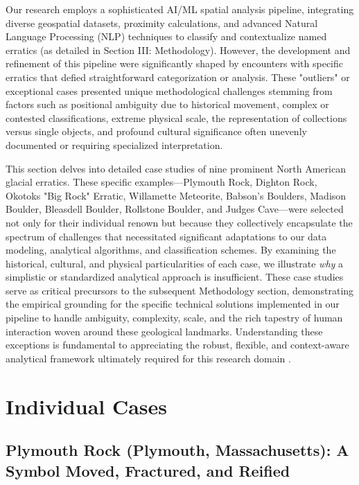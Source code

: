 \documentclass[
11pt, %
english, %
singlespacing, %
headsepline, %
]{MastersDoctoralThesis} %
\begin{document}
Our research employs a sophisticated AI/ML spatial analysis pipeline, integrating diverse geospatial datasets, proximity calculations, and advanced Natural Language Processing (NLP) techniques to classify and contextualize named erratics (as detailed in Section III: Methodology). However, the development and refinement of this pipeline were significantly shaped by encounters with specific erratics that defied straightforward categorization or analysis. These "outliers" or exceptional cases presented unique methodological challenges stemming from factors such as positional ambiguity due to historical movement, complex or contested classifications, extreme physical scale, the representation of collections versus single objects, and profound cultural significance often unevenly documented or requiring specialized interpretation.

This section delves into detailed case studies of nine prominent North American glacial erratics. These specific examples—Plymouth Rock, Dighton Rock, Okotoks "Big Rock" Erratic, Willamette Meteorite, Babson's Boulders, Madison Boulder, Bleasdell Boulder, Rollstone Boulder, and Judges Cave—were selected not only for their individual renown but because they collectively encapsulate the spectrum of challenges that necessitated significant adaptations to our data modeling, analytical algorithms, and classification schemes. By examining the historical, cultural, and physical particularities of each case, we illustrate \emph{why} a simplistic or standardized analytical approach is insufficient. These case studies serve as critical precursors to the subsequent Methodology section, demonstrating the empirical grounding for the specific technical solutions implemented in our pipeline to handle ambiguity, complexity, scale, and the rich tapestry of human interaction woven around these geological landmarks. Understanding these exceptions is fundamental to appreciating the robust, flexible, and context-aware analytical framework ultimately required for this research domain \cite{Cuffey2010, Delcourt1991}.

\section{Individual Cases}
\label{sec:individual_cases}

\subsection{Plymouth Rock (Plymouth, Massachusetts): A Symbol Moved, Fractured, and Reified}
\label{subsec:plymouth}
\end{document}

